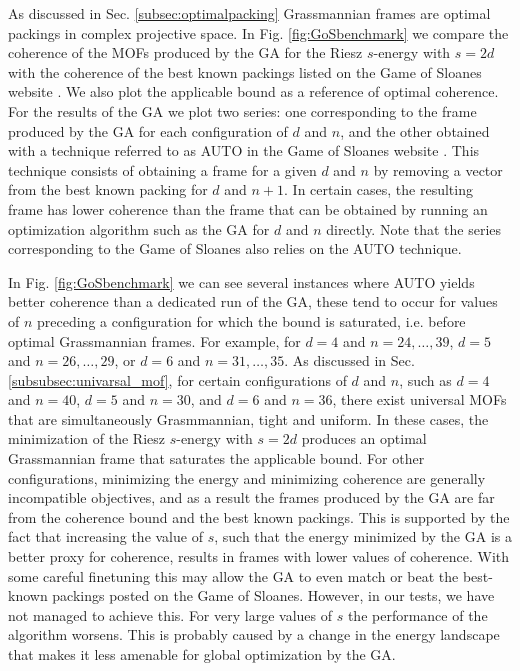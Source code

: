 \documentclass[%
superscriptaddress,
amsmath,amssymb,
 aps,
pra,
floatfix,
]{revtex4-2}
\begin{document}
As discussed in Sec. \ref{subsec:optimalpacking} Grassmannian frames are optimal packings in complex projective space. In Fig. \ref{fig:GoSbenchmark} we compare the coherence of the MOFs produced by the GA for the Riesz $s$-energy with $s = 2d$ with the coherence of the best known packings listed on the Game of Sloanes website \cite{gameofsloanes}. We also plot the applicable bound as a reference of optimal coherence. For the results of the GA we plot two series: one corresponding to the frame produced by the GA for each configuration of $d$ and $n$, and the other obtained with a technique referred to as AUTO in the Game of Sloanes website \cite{gameofsloanes}. This technique consists of obtaining a frame for a given $d$ and $n$ by removing a vector from the best known packing for $d$ and $n+1$. In certain cases, the resulting frame has lower coherence than the frame that can be obtained by running an optimization algorithm such as the GA for $d$ and $n$ directly. Note that the series corresponding to the Game of Sloanes also relies on the AUTO technique. 

In Fig. \ref{fig:GoSbenchmark} we can see several instances where AUTO yields better coherence than a dedicated run of the GA, these tend to occur for values of $n$ preceding a configuration for which the bound is saturated, i.e. before optimal Grassmannian frames. For example, for $d=4$ and $n=24, \ldots, 39$, $d=5$ and $n=26, \ldots, 29$, or $d=6$ and $n=31, \ldots, 35$. As discussed in Sec. \ref{subsubsec:univarsal_mof}, for certain configurations of $d$ and $n$, such as $d=4$ and $n=40$, $d=5$ and $n=30$, and $d=6$ and $n=36$, there exist universal MOFs that are simultaneously Grasmmannian, tight and uniform. In these cases, the minimization of the Riesz $s$-energy with $s=2d$ produces an optimal Grassmannian frame that saturates the applicable bound. For other configurations, minimizing the energy and minimizing coherence are generally incompatible objectives, and as a result the frames produced by the GA are far from the coherence bound and the best known packings. This is supported by the fact that increasing the value of $s$, such that the energy minimized by the GA is a better proxy for coherence, results in frames with lower values of coherence. With some careful finetuning this may allow the GA to even match or beat the best-known packings posted on the Game of Sloanes. However, in our tests, we have not managed to achieve this. For very large values of $s$ the performance of the algorithm worsens. This is probably caused by a change in the energy landscape that makes it less amenable for global optimization by the GA. 
\end{document}
